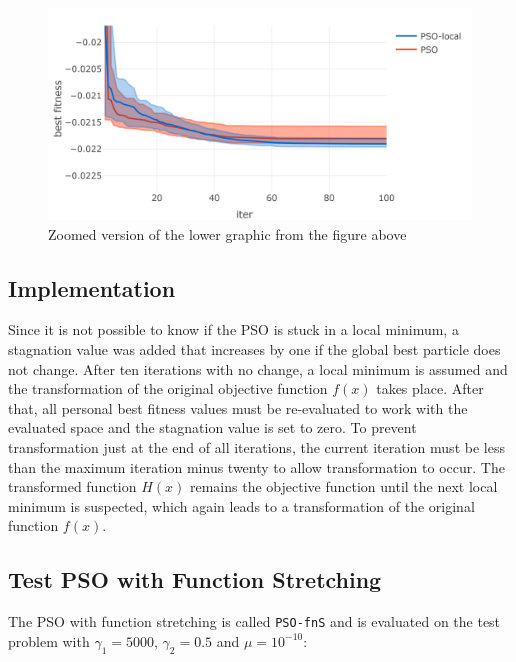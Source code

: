 \documentclass[
  oneside, a4paper, 12pt, openany]{book}
\theoremstyle{definition}
\theoremstyle{definition}
\theoremstyle{definition}
\theoremstyle{definition}
\theoremstyle{remark}
\begin{document}
\begin{figure}[H]
\includegraphics{Master_Thesis_files/figure-latex/unnamed-chunk-12-1} \caption{Zoomed version of the lower graphic from the figure above}\label{fig:unnamed-chunk-12}
\end{figure}

\hypertarget{implementation}{%
\subsection{Implementation}\label{implementation}}

Since it is not possible to know if the PSO is stuck in a local minimum, a stagnation value was added that increases by one if the global best particle does not change. After ten iterations with no change, a local minimum is assumed and the transformation of the original objective function \(f(x)\) takes place. After that, all personal best fitness values must be re-evaluated to work with the evaluated space and the stagnation value is set to zero. To prevent transformation just at the end of all iterations, the current iteration must be less than the maximum iteration minus twenty to allow transformation to occur. The transformed function \(H(x)\) remains the objective function until the next local minimum is suspected, which again leads to a transformation of the original function \(f(x)\).

\hypertarget{test-pso-with-function-stretching}{%
\subsection{Test PSO with Function Stretching}\label{test-pso-with-function-stretching}}

The PSO with function stretching is called \texttt{PSO-fnS} and is evaluated on the test problem with \(\gamma_1 = 5000\), \(\gamma_2 = 0.5\) and \(\mu = 10^{-10}\):
\end{document}
